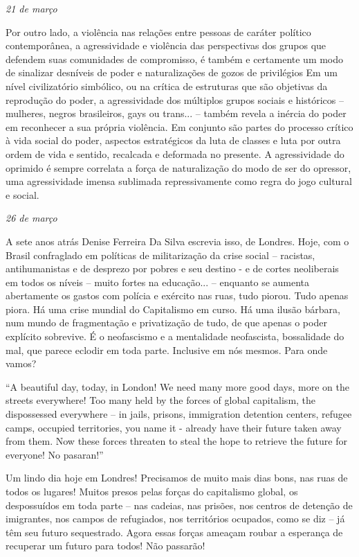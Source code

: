 \begin{flushright}
\emph{21 de março}
\end{flushright}

Por outro lado, a violência nas relações entre pessoas de caráter
político contemporânea, a agressividade e violência das perspectivas dos
grupos que defendem suas comunidades de compromisso, é também e
certamente um modo de sinalizar desníveis de poder e naturalizações de
gozos de privilégios Em um nível civilizatório simbólico, ou na crítica
de estruturas que são objetivas da reprodução do poder, a agressividade
dos múltiplos grupos sociais e históricos -- mulheres, negros
brasileiros, gays ou trans... -- também revela a inércia do poder em
reconhecer a sua própria violência. Em conjunto são partes do processo
crítico à vida social do poder, aspectos estratégicos da luta de classes
e luta por outra ordem de vida e sentido, recalcada e deformada no
presente. A agressividade do oprimido é sempre correlata a força de
naturalização do modo de ser do opressor, uma agressividade imensa
sublimada repressivamente como regra do jogo cultural e social.

\begin{flushright}
\emph{26 de março}
\end{flushright}

A sete anos atrás Denise Ferreira Da Silva escrevia isso, de Londres.
Hoje, com o Brasil confraglado em políticas de militarização da crise
social -- racistas, antihumanistas e de desprezo por pobres e seu destino
- e de cortes neoliberais em todos os níveis -- muito fortes na
educação... -- enquanto se aumenta abertamente os gastos com polícia e
exército nas ruas, tudo piorou. Tudo apenas piora. Há uma crise mundial
do Capitalismo em curso. Há uma ilusão bárbara, num mundo de
fragmentação e privatização de tudo, de que apenas o poder explícito
sobrevive. É o neofascismo e a mentalidade neofascista, bossalidade do
mal, que parece eclodir em toda parte. Inclusive em nós mesmos. Para
onde vamos?

``A beautiful day, today, in London! We need many more good days, more
on the streets everywhere! Too many held by the forces of global
capitalism, the dispossessed everywhere -- in jails, prisons, immigration
detention centers, refugee camps, occupied territories, you name it -
already have their future taken away from them. Now these forces
threaten to steal the hope to retrieve the future for everyone! No
pasaran!''

Um lindo dia hoje em Londres! Precisamos de muito mais dias bons, nas
ruas de todos os lugares! Muitos presos pelas forças do capitalismo
global, os despossuídos em toda parte -- nas cadeias, nas prisões, nos
centros de detenção de imigrantes, nos campos de refugiados, nos
territórios ocupados, como se diz -- já têm seu futuro sequestrado. Agora
essas forças ameaçam roubar a esperança de recuperar um futuro para
todos! Não passarão!

